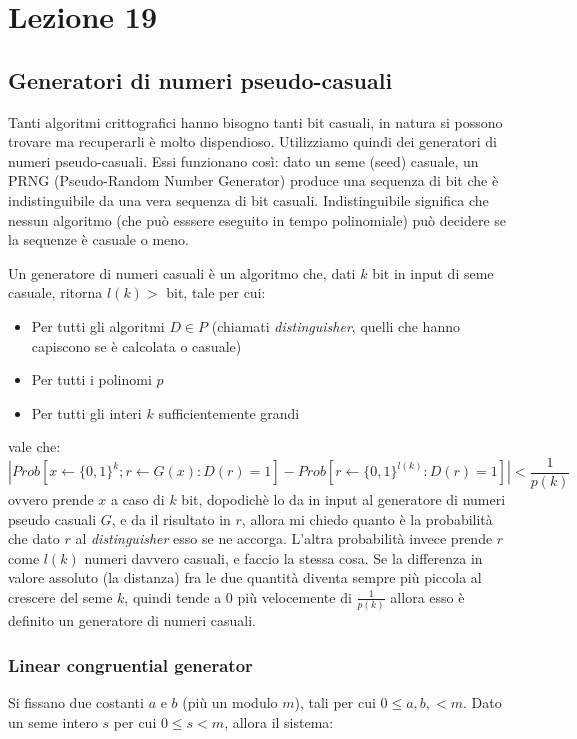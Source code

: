 \section*{Lezione 19}

\subsection*{Generatori di numeri pseudo-casuali}
Tanti algoritmi crittografici hanno bisogno tanti bit casuali, in natura si possono trovare ma recuperarli è molto dispendioso. Utilizziamo quindi dei generatori di numeri pseudo-casuali. Essi funzionano così: dato un seme (seed) casuale, un PRNG (Pseudo-Random Number Generator) produce una sequenza di bit che è indistinguibile da una vera sequenza di bit casuali. Indistinguibile significa che nessun algoritmo (che può esssere eseguito in tempo polinomiale) può decidere se la sequenze è casuale o meno.

Un generatore di numeri casuali è un algoritmo che, dati $k$ bit in input di seme casuale, ritorna $l(k) > $ bit, tale per cui:
\begin{itemize}
	\item Per tutti gli algoritmi $D \in P$ (chiamati \textit{distinguisher}, quelli che hanno capiscono se è calcolata o casuale)
	\item Per tutti i polinomi $p$
	\item Per tutti gli interi $k$ sufficientemente grandi
\end{itemize}
vale che:
\begin{equation*}
|Prob[x \leftarrow \{0, 1\}^k; r \leftarrow G(x):D(r) = 1]-Prob[r \leftarrow\{0,1\}^{l(k)} : D(r) = 1] | < \frac1{p(k)}
\end{equation*}
ovvero prende $x$ a caso di $k$ bit, dopodichè lo da in input al generatore di numeri pseudo casuali $G$, e da il risultato in $r$, allora mi chiedo quanto è la probabilità che dato $r$ al \textit{distinguisher} esso se ne accorga. L'altra probabilità invece prende $r$ come $l(k)$ numeri davvero casuali, e faccio la stessa cosa. Se la differenza in valore assoluto (la distanza) fra le due quantità diventa sempre più piccola al crescere del seme $k$, quindi tende a 0 più velocemente di $\frac1{p(k)}$ allora esso è definito un generatore di numeri casuali.

\subsubsection*{Linear congruential generator}
Si fissano due costanti $a$ e $b$ (più un modulo $m$), tali per cui $0 \leq a, b, < m$.
Dato un seme intero $s$ per cui $0 \leq s < m$, allora il sistema:

